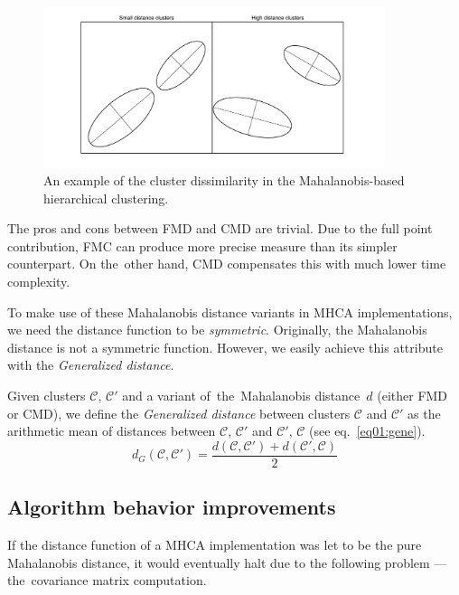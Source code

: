 \begin{figure}\centering
	\includegraphics[width=10cm]{img/ellipses}
	\caption{An example of the cluster dissimilarity in the Mahalanobis-based hierarchical clustering.}
	\label{fig01:ellipses}
\end{figure}



The pros and cons between FMD and CMD are trivial. Due to the full point contribution, FMC can produce more precise measure than its simpler counterpart. On the~other hand, CMD compensates this with much lower time complexity.

\vspace{0.5cm}

To make use of these Mahalanobis distance variants in MHCA implementations, we need the distance function to be \emph{symmetric}. Originally, the Mahalanobis distance is not a symmetric function. However, we easily achieve this attribute with the \emph{Generalized distance}.

\begin{defn}
	Given clusters $\mathcal{C}$, $\mathcal{C}'$ and a variant of~the~Mahalanobis distance~$d$ (either FMD or CMD), we define the \emph{Generalized distance} between clusters $\mathcal{C}$ and $\mathcal{C}'$ as the arithmetic mean of distances between $\mathcal{C}$, $\mathcal{C}'$ and $\mathcal{C}'$, $\mathcal{C}$ (see eq.~\ref{eq01:gene}).
	\begin{equation}\label{eq01:gene}
	d_G(\mathcal{C},\mathcal{C}') = \frac{d(\mathcal{C},\mathcal{C}')+d(\mathcal{C}',\mathcal{C})}{2}
	\end{equation}
	\label{def01:gene}
\end{defn}  


\subsection{Algorithm behavior improvements}

If the distance function of a MHCA implementation was let to be the pure Mahalanobis distance, it would eventually halt due to the following problem --- the~covariance matrix computation.

